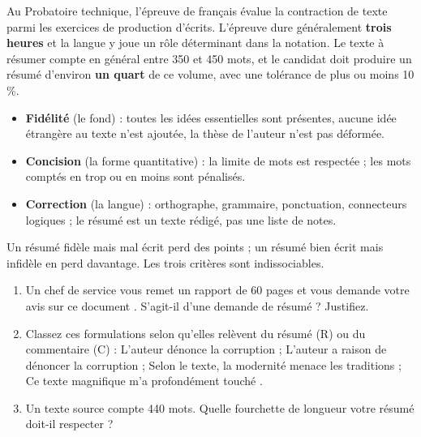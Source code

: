 \documentclass[11pt]{article}
\begin{document}
Au Probatoire technique, l'épreuve de français évalue la contraction de texte parmi les exercices de production d'écrits. L'épreuve dure généralement \textbf{trois heures} et la langue y joue un rôle déterminant dans la notation. Le texte à résumer compte en général entre 350 et 450 mots, et le candidat doit produire un résumé d'environ \textbf{un quart} de ce volume, avec une tolérance de plus ou moins 10 \%.

\begin{aretenir}
\begin{itemize}
\item \textbf{Fidélité} (le fond) : toutes les idées essentielles sont présentes, aucune idée étrangère au texte n'est ajoutée, la thèse de l'auteur n'est pas déformée.
\item \textbf{Concision} (la forme quantitative) : la limite de mots est respectée ; les mots comptés en trop ou en moins sont pénalisés.
\item \textbf{Correction} (la langue) : orthographe, grammaire, ponctuation, connecteurs logiques ; le résumé est un texte rédigé, pas une liste de notes.
\end{itemize}
Un résumé fidèle mais mal écrit perd des points ; un résumé bien écrit mais infidèle en perd davantage. Les trois critères sont indissociables.
\end{aretenir}

\begin{exercice}
\begin{enumerate}
\item Un chef de service vous remet un rapport de 60 pages et vous demande \og votre avis sur ce document \fg{}. S'agit-il d'une demande de résumé ? Justifiez.
\item Classez ces formulations selon qu'elles relèvent du résumé (R) ou du commentaire (C) : \og L'auteur dénonce la corruption \fg{} ; \og L'auteur a raison de dénoncer la corruption \fg{} ; \og Selon le texte, la modernité menace les traditions \fg{} ; \og Ce texte magnifique m'a profondément touché \fg{}.
\item Un texte source compte 440 mots. Quelle fourchette de longueur votre résumé doit-il respecter ?
\end{enumerate}
\end{exercice}
\end{document}
